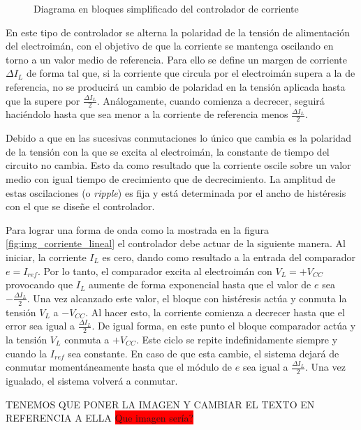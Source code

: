 \begin{figure}[H]
	\centering
	
	\caption{Diagrama en bloques simplificado del controlador de corriente}	\label{fig:img_diag-en-bloques}
\end{figure}

En este tipo de controlador se alterna la polaridad de la tensión de alimentación del electroimán, con el objetivo de que la corriente se mantenga oscilando en torno a un valor medio de referencia. Para ello se define un margen de corriente $\Delta I_L$ de forma tal que, si la corriente que circula por el electroimán supera a la de referencia, no se producirá un cambio de polaridad en la tensión aplicada hasta que la supere por $\frac{\Delta I_L}{2}$. Análogamente, cuando comienza a decrecer, seguirá haciéndolo hasta que sea menor a la corriente de referencia menos $\frac{\Delta I_L}{2}$.

Debido a que en las sucesivas conmutaciones lo único que cambia es la polaridad de la tensión con la que se excita al electroimán, la constante de tiempo del circuito no cambia. Esto da como resultado que la corriente oscile sobre un valor medio con igual tiempo de crecimiento que de decrecimiento. La amplitud de estas oscilaciones (o \textsl{ripple}) es fija y está determinada por el ancho de histéresis con el que se diseñe el controlador.

Para lograr una forma de onda como la mostrada en la  figura \ref{fig:img_corriente_lineal} el controlador debe actuar de la siguiente manera. Al iniciar, la corriente $I_L$ es cero, dando como resultado a la entrada del comparador  $e = I_{ref}$. Por lo tanto, el comparador excita al electroimán con $V_L=+V_{CC}$ provocando que $I_L$ aumente de forma exponencial hasta que el valor de $e$ sea $-\frac{\Delta I_L}{2}$. Una vez alcanzado este valor, el bloque con histéresis actúa y conmuta la tensión $V_L$ a $-V_{CC}$. Al hacer esto, la corriente comienza a decrecer hasta que el error sea igual a $\frac{\Delta I_L}{2}$. De igual forma, en este punto el bloque comparador actúa y la tensión $V_L$ conmuta a $+V_{CC}$. Este ciclo se repite indefinidamente siempre y cuando la $I_{ref}$ sea constante. En caso de que esta cambie, el sistema dejará de conmutar momentáneamente hasta que el módulo de $e$ sea igual a $\frac{\Delta I_L}{2}$. Una vez igualado, el sistema volverá a conmutar.

TENEMOS QUE PONER LA IMAGEN Y CAMBIAR EL TEXTO EN REFERENCIA A ELLA
\colorbox{red}{Que imagen sería?}

